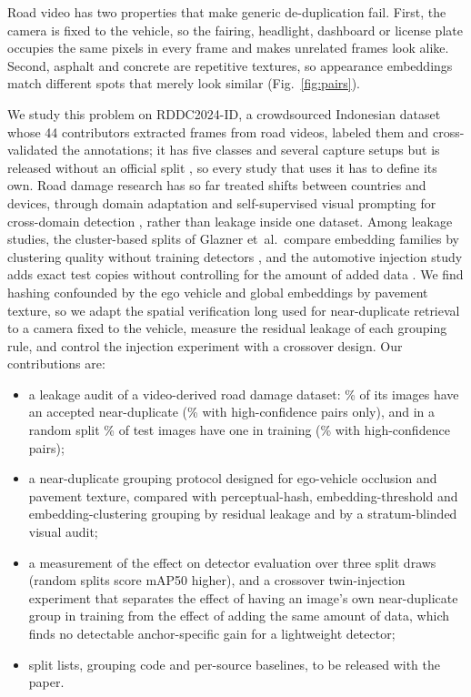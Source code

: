 \documentclass[conference,a4paper]{IEEEtran}
\begin{document}
Road video has two properties that make generic de-duplication fail. First, the camera is fixed to the vehicle, so the fairing, headlight, dashboard or license plate occupies the same pixels in every frame and makes unrelated frames look alike. Second, asphalt and concrete are repetitive textures, so appearance embeddings match different spots that merely look similar (Fig.~\ref{fig:pairs}).

We study this problem on RDDC2024-ID, a crowdsourced Indonesian dataset whose 44 contributors extracted frames from road videos, labeled them and cross-validated the annotations; it has five classes and several capture setups but is released without an official split \cite{rddc2024id}, so every study that uses it has to define its own. Road damage research has so far treated shifts between countries and devices, through domain adaptation \cite{lin2023dardd} and self-supervised visual prompting for cross-domain detection \cite{xiao2026probe}, rather than leakage inside one dataset. Among leakage studies, the cluster-based splits of Glazner et~al.\ compare embedding families by clustering quality without training detectors \cite{glazner2026findleak}, and the automotive injection study adds exact test copies without controlling for the amount of added data \cite{babu2024leakage}. We find hashing confounded by the ego vehicle and global embeddings by pavement texture, so we adapt the spatial verification long used for near-duplicate retrieval \cite{philbin2007spatial} to a camera fixed to the vehicle, measure the residual leakage of each grouping rule, and control the injection experiment with a crossover design. Our contributions are:
\begin{itemize}
\item a leakage audit of a video-derived road damage dataset: \NDshare\% of its images have an accepted near-duplicate (\PrevStrong\% with high-confidence pairs only), and in a random split \LeakRand\% of test images have one in training (\LeakRandStrong\% with high-confidence pairs);
\item a near-duplicate grouping protocol designed for ego-vehicle occlusion and pavement texture, compared with perceptual-hash, embedding-threshold and embedding-clustering grouping by residual leakage and by a stratum-blinded visual audit;
\item a measurement of the effect on detector evaluation over three split draws (random splits score \InflFifty{} mAP50 higher), and a crossover twin-injection experiment that separates the effect of having an image's own near-duplicate group in training from the effect of adding the same amount of data, which finds no detectable anchor-specific gain for a lightweight detector;
\item split lists, grouping code and per-source baselines, to be released with the paper.
\end{itemize}
\end{document}
